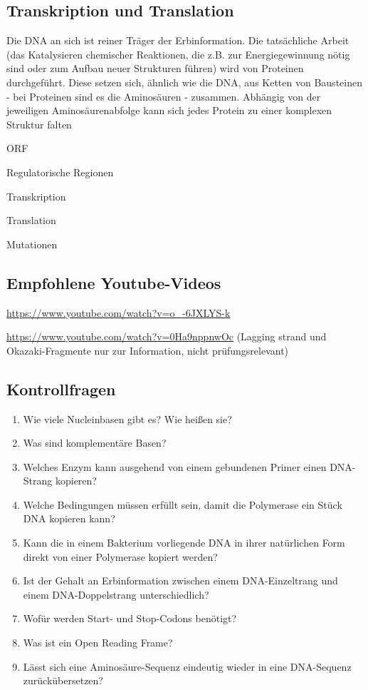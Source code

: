 \subsection{Transkription und Translation}
Die DNA an sich ist reiner Träger der Erbinformation. Die tatsächliche Arbeit (das Katalysieren chemischer Reaktionen, die z.B. zur Energiegewinnung nötig sind oder zum Aufbau neuer Strukturen führen) wird von Proteinen durchgeführt. Diese setzen sich, ähnlich wie die DNA, aus Ketten von Bausteinen - bei Proteinen sind es die Aminosäuren - zusammen. Abhängig von der jeweiligen Aminosäurenabfolge kann sich jedes Protein zu einer komplexen Struktur falten

ORF

Regulatorische Regionen

Transkription

Translation

Mutationen

\subsection{Empfohlene Youtube-Videos}
\begin{description}[align=left]
	\item [DNA-Struktur] \href{https://www.youtube.com/watch?v=o\_-6JXLYS-k}{https://www.youtube.com/watch?v=o\_-6JXLYS-k}
	\item [DNA-Replikation] \href{https://www.youtube.com/watch?v=0Ha9nppnwOc}{https://www.youtube.com/watch?v=0Ha9nppnwOc} (Lagging strand und Okazaki-Fragmente nur zur Information, nicht prüfungsrelevant)
\end{description}
  
\subsection{Kontrollfragen}
\begin{enumerate}
	\item Wie viele Nucleinbasen gibt es? Wie heißen sie?
	\item Was sind komplementäre Basen?
	\item Welches Enzym kann ausgehend von einem gebundenen Primer einen DNA-Strang kopieren?
	\item Welche Bedingungen müssen erfüllt sein, damit die Polymerase ein Stück DNA kopieren kann?
	\item Kann die in einem Bakterium vorliegende DNA in ihrer natürlichen Form direkt von einer Polymerase kopiert werden?
	\item Ist der Gehalt an Erbinformation zwischen einem DNA-Einzeltrang und einem DNA-Doppelstrang unterschiedlich?
	\item Wofür werden Start- und Stop-Codons benötigt?
	\item Was ist ein Open Reading Frame?
	\item Lässt sich eine Aminosäure-Sequenz eindeutig wieder in eine DNA-Sequenz zurückübersetzen?
\end{enumerate}

